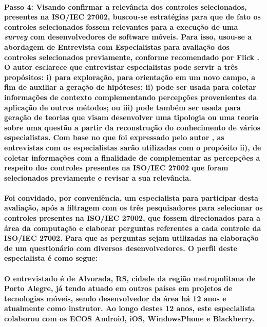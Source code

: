     \paragraph{
    \textbf{Passo 4:} Visando confirmar a relevância dos controles selecionados, presentes na ISO/IEC 27002, buscou-se estratégias para que de fato os controles selecionados fossem relevantes para a execução de uma \textit{survey} com desenvolvedores de software móveis. Para isso, usou-se a abordagem de Entrevista com Especialistas para avaliação dos controles selecionados previamente, conforme recomendado por Flick \cite{flick2018introduction}. O autor esclarece que entrevistar especialistas pode servir a três propósitos: i) para exploração, para orientação em um novo campo, a fim de auxiliar a geração de hipóteses; ii) pode ser usada para coletar informações de contexto complementando percepções provenientes da aplicação de outros métodos; ou iii) pode também ser usada para geração de teorias que visam desenvolver uma tipologia ou uma teoria sobre uma questão a partir da reconstrução do conhecimento de vários especialistas. Com base no que foi expressado pelo autor \cite{flick2018introduction}, as entrevistas com os especialistas sarão utilizadas com o propósito ii), de coletar informações com a finalidade de complementar as percepções a respeito dos controles presentes na ISO/IEC 27002 que foram selecionados previamente e revisar a sua relevância.
    }
    
    \paragraph{
    Foi convidado, por conveniência, um especialista para participar desta avaliação, após a filtragem com os três pesquisadores para selecionar os controles presentes na ISO/IEC 27002, que fossem direcionados para a área da computação e elaborar perguntas referentes a cada controle da ISO/IEC 27002. Para que as perguntas sejam utilizadas na elaboração de um questionário com diversos desenvolvedores. O perfil deste especialista é como segue:}   
    
    \paragraph{
    O entrevistado é de Alvorada, RS, cidade da região metropolitana de Porto Alegre, já tendo atuado em outros países em projetos de tecnologias móveis, sendo desenvolvedor da área há 12 anos e atualmente como instrutor. Ao longo destes 12 anos, este especialista colaborou com os ECOS Android, iOS, WindowsPhone e Blackberry.
    }
    
